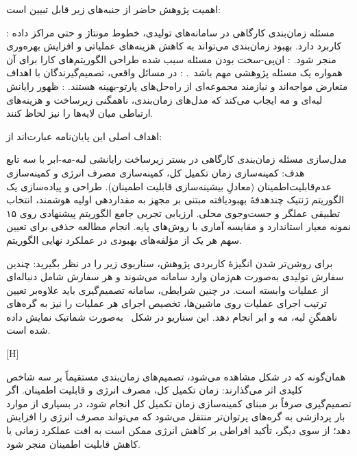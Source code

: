
اهمیت پژوهش حاضر از جنبه‌های زیر قابل تبیین است:

:
مسئله زمان‌بندی کارگاهی در سامانه‌های تولیدی،
خطوط مونتاژ و حتی مراکز داده کاربرد دارد.
بهبود زمان‌بندی می‌تواند به کاهش هزینه‌های عملیاتی
و افزایش بهره‌وری منجر شود.
:
ان‌پی-سخت بودن مسئله سبب شده طراحی الگوریتم‌های کارا
برای آن همواره یک مسئله پژوهشی مهم باشد~\cite{garey1979computers}.
:
در مسائل واقعی،
تصمیم‌گیرندگان با اهداف متعارض مواجه‌اند
و نیازمند مجموعه‌ای از راه‌حل‌های پارتو-بهینه هستند.
:
ظهور رایانش لبه‌ای و مه
ایجاب می‌کند که مدل‌های زمان‌بندی، ناهمگنی زیرساخت
و هزینه‌های ارتباطی میان لایه‌ها را نیز لحاظ کنند.



اهداف اصلی این پایان‌نامه عبارت‌اند از:

مدل‌سازی مسئله زمان‌بندی کارگاهی
در بستر زیرساخت رایانشی لبه-مه-ابر
با سه تابع هدف:
کمینه‌سازی زمان تکمیل کل،
کمینه‌سازی مصرف انرژی
و کمینه‌سازی عدم‌قابلیت‌اطمینان (معادلِ بیشینه‌سازی قابلیت اطمینان).
طراحی و پیاده‌سازی یک الگوریتم ژنتیک چندهدفهٔ بهبودیافته
مبتنی بر 
مجهز به مقداردهی اولیه هوشمند،
انتخاب تطبیقی عملگر
و جست‌وجوی محلی.
ارزیابی تجربی جامع الگوریتم پیشنهادی
روی ۱۵ نمونه معیار استاندارد
و مقایسه آماری با روش‌های پایه.
انجام مطالعه حذفی
برای تعیین سهم هر یک از مؤلفه‌های بهبودی
در عملکرد نهایی الگوریتم.



برای روشن‌تر شدن انگیزهٔ کاربردی پژوهش، سناریوی زیر را در نظر بگیرید:
چندین سفارش تولیدی به‌صورت هم‌زمان وارد سامانه می‌شوند و هر سفارش شامل
دنباله‌ای از عملیات وابسته است.
در چنین شرایطی، سامانه تصمیم‌گیری باید علاوه‌بر تعیین ترتیب اجرای عملیات روی ماشین‌ها،
تخصیص اجرای هر عملیات را نیز به گره‌های ناهمگنِ لبه، مه و ابر انجام دهد.
این سناریو در شکل~ به‌صورت شماتیک نمایش داده شده است.

[H]

همان‌گونه که در شکل مشاهده می‌شود، تصمیم‌های زمان‌بندی مستقیماً بر سه شاخص کلیدی اثر می‌گذارند:
زمان تکمیل کل، مصرف انرژی و قابلیت اطمینان.
اگر تصمیم‌گیری صرفاً بر مبنای کمینه‌سازی زمان تکمیل کل انجام شود،
در بسیاری از موارد بار پردازشی به گره‌های پرتوان‌تر منتقل می‌شود که می‌تواند
مصرف انرژی را افزایش دهد؛
از سوی دیگر، تأکید افراطی بر کاهش انرژی ممکن است
به افت عملکرد زمانی یا کاهش قابلیت اطمینان منجر شود.


